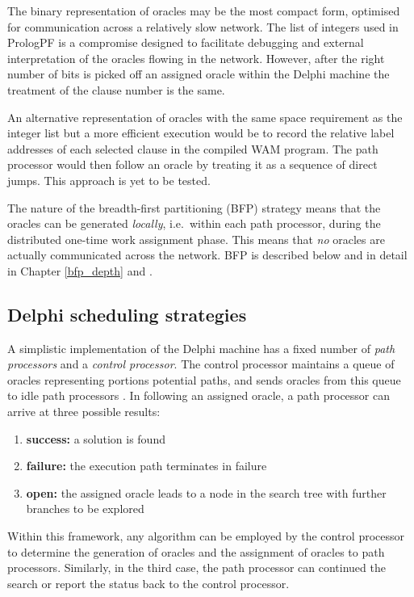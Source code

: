 The binary representation of oracles may be the most compact form, optimised 
for communication across
a relatively slow network.  The list of integers used in PrologPF is a compromise
designed to facilitate debugging and external interpretation of the oracles flowing
in the network.  However, after the right number of bits is picked off an assigned 
oracle within the Delphi machine the treatment of the clause number is the same.

An alternative representation of oracles with the same space requirement as the
integer list but a more efficient execution would be to record the
relative label addresses of
each selected clause in the compiled WAM program.  The path processor would then follow
an oracle by treating it as a sequence of direct jumps.  This approach is yet to be
tested.

The nature of the breadth-first partitioning (BFP) strategy means that the oracles can
be generated \textit{locally}, i.e.\ within each path processor,
during the distributed one-time work assignment phase.  This means that
\textit{no} oracles are actually communicated across the network.  BFP is described
below and in detail in Chapter \ref{bfp_depth} and \cite{Sar95}.

\subsection{Delphi scheduling strategies}

A simplistic implementation of the Delphi machine has a fixed number of
\textit{path processors} and a \textit{control processor}.  The control processor
maintains a queue of oracles representing portions potential paths, and sends
oracles from this queue to idle path processors \cite{AM88}.  In following an
assigned oracle, a path processor can arrive at three possible results:
\begin{enumerate}
\item{\textbf{success:} a solution is found}
\item{\textbf{failure:} the execution path terminates in failure}
\item{\textbf{open:} the assigned oracle leads to a node in the search tree with further
  branches to be explored}
\end{enumerate}

Within this framework, any algorithm can be employed by the control processor to
determine the generation of oracles
and the assignment of oracles to path processors.  Similarly,
in the third case, the path processor can
continued the search or report the status back to the control processor.

